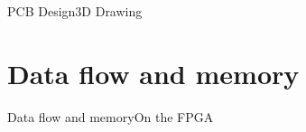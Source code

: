 \documentclass[10pt]{beamer}
\begin{document}
\begin{frame}{PCB Design}{3D Drawing}
\end{frame}

\section{Data flow and memory}

\begin{frame}{Data flow and memory}{On the FPGA}
\end{frame}
\end{document}
